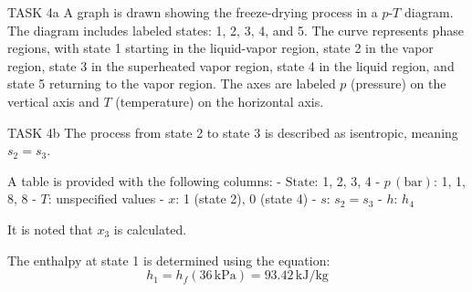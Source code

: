 TASK 4a  
A graph is drawn showing the freeze-drying process in a \( p \)-\( T \) diagram. The diagram includes labeled states: 1, 2, 3, 4, and 5. The curve represents phase regions, with state 1 starting in the liquid-vapor region, state 2 in the vapor region, state 3 in the superheated vapor region, state 4 in the liquid region, and state 5 returning to the vapor region. The axes are labeled \( p \) (pressure) on the vertical axis and \( T \) (temperature) on the horizontal axis.  

TASK 4b  
The process from state 2 to state 3 is described as isentropic, meaning \( s_2 = s_3 \).  

A table is provided with the following columns:  
- \( \text{State} \): 1, 2, 3, 4  
- \( p \, (\text{bar}) \): 1, 1, 8, 8  
- \( T \): unspecified values  
- \( x \): 1 (state 2), 0 (state 4)  
- \( s \): \( s_2 = s_3 \)  
- \( h \): \( h_4 \)  

It is noted that \( x_3 \) is calculated.  

The enthalpy at state 1 is determined using the equation:  
\[
h_1 = h_f(36 \, \text{kPa}) = 93.42 \, \text{kJ/kg}
\]